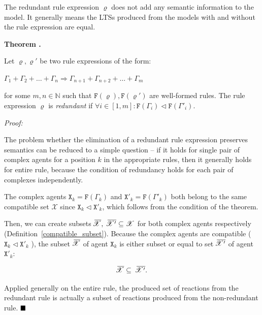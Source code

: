 \documentclass[12pt, twoside]{fithesis2} %
\newcounter{counter}[section]
\renewcommand{\thecounter}{\thesection.\arabic{counter}}
\newenvironment{proof}{\noindent\emph{Proof:~ }\nopagebreak \begin{itshape}}{\end{itshape}\bigskip}
\newenvironment{theorem}{\bigskip\refstepcounter{counter}\noindent\textbf{Theorem \thecounter }\nopagebreak \begin{itshape}}{\end{itshape}\medskip}
\newcommand*{\QEDA}{\hfill\ensuremath{\blacksquare}}%
\begin{document}
The redundant rule expression $\varrho$ does not add any semantic information to the model. It generally means the LTSs produced from the models with and without the rule expression are equal.

\begin{theorem}
\label{redundant_if}
Let $\varrho, \varrho'$ be two rule expressions of the form:
\begin{center}
$ \Gamma_1 + \Gamma_2 + \ldots + \Gamma_n \Rightarrow \Gamma_{n+1} + \Gamma_{n+2} + \ldots + \Gamma_{m} $
\end{center}

for some $m,n \in \mathbb{N}$ such that $\mathtt{F}(\varrho), \mathtt{F}(\varrho')$ are well-formed rules. The rule expression $\varrho$ is \emph{redundant} if $ \forall i \in [ 1, m ]: \mathtt{F}(\Gamma_i) \lhd \mathtt{F}(\Gamma'_i). $
\end{theorem}

\begin{proof}
The problem whether the elimination of a redundant rule expression preserves semantics can be reduced to a simple question -- if it holds for single pair of complex agents for a position $k$ in the appropriate rules, then it generally holds for entire rule, because the condition of redundancy holds for each pair of complexes independently.

The complex agents $\mathtt{X}_k = \mathtt{F}(\Gamma_k)$ and $\mathtt{X}'_k = \mathtt{F}(\Gamma'_k)$ both belong to the same compatible set $\mathscr{X}$ since $\mathtt{X}_k \lhd \mathtt{X}'_k$, which follows from the condition of the theorem. 

Then, we can create subsets $\mkern2mu\overline{\mkern-4.5mu \mathscr{X}},~ \mkern2mu\overline{\mkern-4.5mu \mathscr{X}'} \subseteq \mathscr{X}$ for both complex agents respectively (Definition~\ref{compatible_subset}). Because the complex agents are compatible ($\mathtt{X}_k \lhd \mathtt{X}'_k$ ), the subset $\mkern2mu\overline{\mkern-4.5mu \mathscr{X}}$ of agent $\mathtt{X}_k$ is either subset or equal to set $\mkern2mu\overline{\mkern-4.5mu \mathscr{X}'}$ of agent $\mathtt{X}'_k$:

$$\mkern2mu\overline{\mkern-4.5mu \mathscr{X}} \subseteq ~\mkern2mu\overline{\mkern-4.5mu \mathscr{X}'}.$$

Applied generally on the entire rule, the produced set of reactions from the redundant rule is actually a subset of reactions produced from the non-redundant rule. $\QEDA$
\end{proof}
\end{document}

